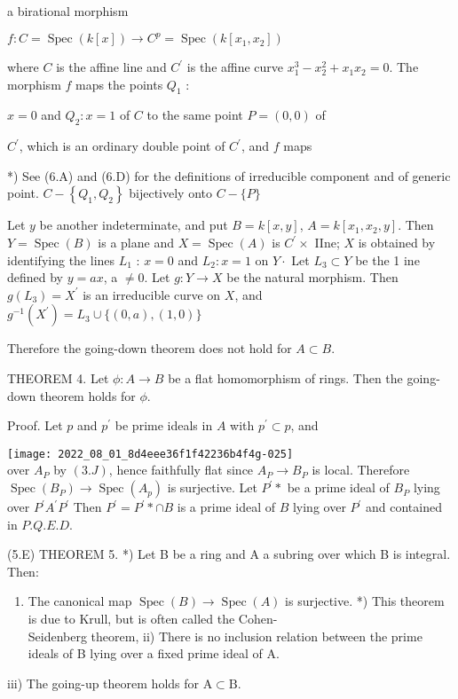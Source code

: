 a birational morphism

$f: C=\operatorname{Spec}(k[x]) \rightarrow C^{p}=\operatorname{Spec}\left(k\left[x_{1}, x_{2}\right]\right)$

where $C$ is the affine line and $C^{\prime}$ is the affine curve $x_{1}^{3}-x_{2}^{2}+x_{1} x_{2}=0$. The morphism $f$ maps the points $Q_{1}$ :

$x=0$ and $Q_{2}: x=1$ of $C$ to the same point $P=(0,0)$ of

$C^{\prime}$, which is an ordinary double point of $C^{\prime}$, and $f$ maps

*) See (6.A) and (6.D) for the definitions of irreducible component and of generic point. $C-\left\{Q_{1}, Q_{2}\right\}$ bijectively onto $C-\{P\}$

Let $y$ be another indeterminate, and put $B=k[x, y]$, $A=k\left[x_{1}, x_{2}, y\right]$. Then $Y=\operatorname{Spec}(B)$ is a plane and $X=\operatorname{Spec}(A)$ is $C^{\prime} \times$ IIne; $X$ is obtained by identifying the lines $L_{1}$ : $x=0$ and $L_{2}: x=1$ on $Y \cdot$ Let $L_{3} \subset Y$ be the 1 ine defined by $y=a x$, a $\neq 0$. Let $g: Y \rightarrow X$ be the natural morphism. Then $g\left(L_{3}\right)=X^{\prime}$ is an irreducible curve on $X$, and $g^{-1}\left(X^{\prime}\right)=L_{3} \cup\{(0, a),(1,0)\}$

Therefore the going-down theorem does not hold for $A \subset B$.

THEOREM 4. Let $\phi: A \rightarrow B$ be a flat homomorphism of rings. Then the going-down theorem holds for $\phi$.

Proof. Let $p$ and $p^{\prime}$ be prime ideals in $A$ with $p^{\prime} \subset p$, and

\texttt{[image: 2022\_08\_01\_8d4eee36f1f42236b4f4g-025]}\\
over $A_{P}$ by $(3 . J)$, hence faithfully flat since $A_{P} \rightarrow B_{P}$ is local. Therefore $\operatorname{Spec}\left(B_{P}\right) \rightarrow \operatorname{Spec}\left(A_{p}\right)$ is surjective. Let $P^{\prime} *$ be a prime ideal of $B_{P}$ lying over $P^{\prime} A^{\prime} P^{\prime}$ Then $P^{\prime}=P^{\prime} * \cap B$ is a prime ideal of $B$ lying over $P^{\prime}$ and contained in $P . Q . E . D$.

(5.E) THEOREM 5. *) Let B be a ring and A a subring over which B is integral. Then:

\begin{enumerate}
  \item The canonical map $\operatorname{Spec}(B) \rightarrow \operatorname{Spec}(A)$ is surjective. *) This theorem is due to Krull, but is often called the Cohen-\\
Seidenberg theorem, ii) There is no inclusion relation between the prime ideals of B lying over a fixed prime ideal of A.
\end{enumerate}
iii) The going-up theorem holds for $\mathrm{A} \subset \mathrm{B}$.

